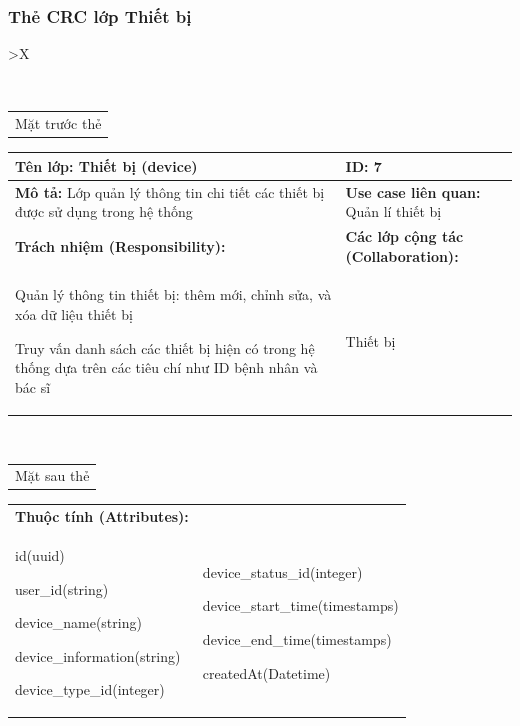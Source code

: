 \subsubsection{Thẻ CRC lớp Thiết bị}

\begin{xltabular}{\textwidth}{
		>{\centering\arraybackslash}X
	}
	\caption{\bfseries \fontsize{12pt}{0pt}\selectfont Thẻ CRC lớp Thiết bị}
	\\
	\begin{tabularx}{0.9\textwidth}{X}
		Mặt trước thẻ
	\end{tabularx}
	\begin{tabularx}{0.9\textwidth}{|X|X|}
		\hline
		\textbf{Tên lớp:} Thiết bị (device)                                                     & \textbf{ID:} 7                                 \\
		\hline
		\textbf{Mô tả:} Lớp quản lý thông tin chi tiết các thiết bị được sử dụng trong hệ thống & \textbf{Use case liên quan:}  Quản lí thiết bị \\
		\hline
		\textbf{Trách nhiệm (Responsibility):}                                                  & \textbf{Các lớp cộng tác (Collaboration):}     \\
		Quản lý thông tin thiết bị: thêm mới, chỉnh sửa, và xóa dữ liệu thiết bị

		Truy vấn danh sách các thiết bị hiện có trong hệ thống dựa trên các tiêu chí như ID bệnh nhân và bác sĩ
		                                                                                        &
		Thiết bị
		\\
		\hline
	\end{tabularx}
	\\
	\begin{tabularx}{0.9\textwidth}{X}
		Mặt sau thẻ
	\end{tabularx}
	\begin{tabularx}{0.9\textwidth}{|X|X|}
		\hline
		\textbf{Thuộc tính (Attributes):} & \\
		id(uuid)

		user\_id(string)

		device\_name(string)

		device\_information(string)

		device\_type\_id(integer)
		                                  &
		device\_status\_id(integer)

		device\_start\_time(timestamps)

		device\_end\_time(timestamps)

		createdAt(Datetime)


\end{tabularx}
\end{xltabular}

